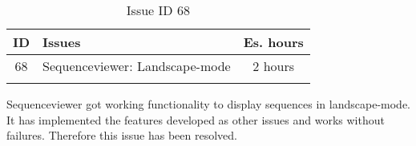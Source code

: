 \begin{longtable} { | c | p{12cm} | c | } 
\hline
	ID 	&	Issues	&		 Es. hours \\\hline
	 68	&	Sequenceviewer: Landscape-mode	&	2 hours \\\hline
\caption{Issue ID 68}
\label{tab:spr4_SVlandscape}
\end{longtable}

Sequenceviewer got working functionality to display sequences in landscape-mode. It has implemented the features developed as other issues and works without failures. Therefore this issue has been resolved.